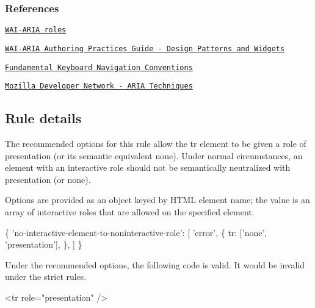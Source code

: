 \subsubsection*{References}


\begin{DoxyEnumerate}
\item \href{https://www.w3.org/TR/wai-aria-1.1/#usage_intro}{\tt W\+A\+I-\/\+A\+R\+IA roles}
\end{DoxyEnumerate}
\begin{DoxyEnumerate}
\item \href{https://www.w3.org/TR/wai-aria-practices-1.1/#aria_ex}{\tt W\+A\+I-\/\+A\+R\+IA Authoring Practices Guide -\/ Design Patterns and Widgets}
\end{DoxyEnumerate}
\begin{DoxyEnumerate}
\item \href{https://www.w3.org/TR/wai-aria-practices-1.1/#kbd_generalnav}{\tt Fundamental Keyboard Navigation Conventions}
\end{DoxyEnumerate}
\begin{DoxyEnumerate}
\item \href{https://developer.mozilla.org/en-US/docs/Web/Accessibility/ARIA/ARIA_Techniques/Using_the_button_role#Keyboard_and_focus}{\tt Mozilla Developer Network -\/ A\+R\+IA Techniques}
\end{DoxyEnumerate}

\subsection*{Rule details}

The recommended options for this rule allow the {\ttfamily tr} element to be given a role of {\ttfamily presentation} (or its semantic equivalent {\ttfamily none}). Under normal circumstances, an element with an interactive role should not be semantically neutralized with {\ttfamily presentation} (or {\ttfamily none}).

Options are provided as an object keyed by H\+T\+ML element name; the value is an array of interactive roles that are allowed on the specified element.


\begin{DoxyCode}
\{
  'no-interactive-element-to-noninteractive-role': [
    'error',
    \{
      tr: ['none', 'presentation'],
    \},
  ]
\}
\end{DoxyCode}


Under the recommended options, the following code is valid. It would be invalid under the strict rules.


\begin{DoxyCode}
<tr role="presentation" />
\end{DoxyCode}
 